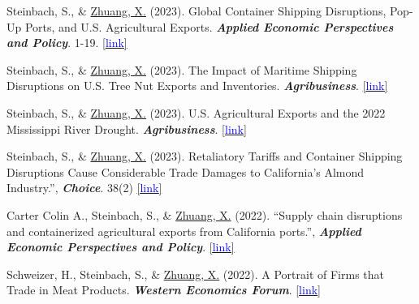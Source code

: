 \documentclass[10.5 pt,letterpaper]{article}
\renewenvironment{itemize}{
	\begin{list}{}{
			\setlength{\leftmargin}{1.5em}
		}
	}{
	\end{list}
}
\begin{document}
		\begin{itemize}
 
 
 
 
  	 \item[-]   Steinbach, S.,  \&  \underline{Zhuang, X.} (2023). Global Container Shipping Disruptions, Pop-Up Ports, and U.S. Agricultural Exports. \textit{\textbf{Applied Economic Perspectives and Policy}}. 1-19.  
 \href{http://doi.org/10.1002/aepp.13399}{[{\underline{\textcolor{blue}{link}}}]}
 
  	 \item[-]   Steinbach, S.,  \&  \underline{Zhuang, X.} (2023).  The Impact of Maritime Shipping Disruptions on U.S. Tree Nut Exports and Inventories.   \textit{\textbf{Agribusiness}}. 
 \href{https://doi.org/10.1002/agr.21809}{[{\underline{\textcolor{blue}{link}}}]}
 
 
 
  	 \item[-]   Steinbach, S.,  \&  \underline{Zhuang, X.} (2023).   U.S. Agricultural Exports and the 2022 Mississippi River Drought.  \textit{\textbf{Agribusiness}}. 	\href{https://ageconsearch.umn.edu/record/335476/files/26473.pdf}{[{\underline{\textcolor{blue}{link}}}]}
 
 
 
  	 \item[-]   Steinbach, S.,  \&  \underline{Zhuang, X.} (2023).  Retaliatory Tariffs and Container Shipping Disruptions Cause Considerable Trade Damages to California’s Almond Industry.'',  \textit{\textbf{Choice}}. 38(2) 	\href{https://econpapers.repec.org/scripts/redir.pf?u=https%3A%2F%2Fageconsearch.umn.edu%2Frecord%2F337188%2Ffiles%2FSteinbach_Retaliatory_38.pdf;h=repec:ags:aaeach:337188}{[{\underline{\textcolor{blue}{link}}}]}
 
 


   	 \item[-]   Carter Colin A., Steinbach, S.,  \&  \underline{Zhuang, X.} (2022). ``Supply chain disruptions and containerized agricultural exports from California ports.'', \textit{\textbf{Applied Economic Perspectives and Policy}}. 
 \href{https://doi.org/10.1002/aepp.13311}{[{\underline{\textcolor{blue}{link}}}]}
 

   	 \item[-]   Schweizer, H., Steinbach, S.,  \&  \underline{Zhuang, X.} (2022).  A Portrait of Firms that Trade in Meat Products. \textit{\textbf{Western Economics Forum}}.   \href{https://waeaonline.org/wp-content/uploads/2022/12/WEF-Fall-2022-Issue-20-Volume-2-All-Intro-and-Articles.pdf#page=6}{[{\underline{\textcolor{blue}{link}}}]}
 

\end{itemize}
\end{document}

